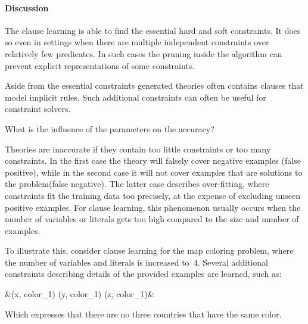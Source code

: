 \paragraph{Discussion}
The clause learning is able to find the essential hard and soft constraints.
It does so even in settings when there are multiple independent constraints over relatively few predicates.
In such cases the pruning inside the algorithm can prevent explicit representations of some constraints.

Aside from the essential constraints generated theories often contains clauses that model implicit rules.
Such additional constraints can often be useful for constraint solvers.

\begin{question}
	What is the influence of the parameters on the accuracy?
	\label{q:cd_acc_influence}
\end{question}

\begin{observation}
	Theories are inaccurate if they contain too little constraints or too many constraints.
	In the first case the theory will falsely cover negative examples (false positive), while in the second case it will not cover examples that are solutions to the problem(false negative).
	The latter case describes over-fitting, where constraints fit the training data too precisely, at the expense of excluding unseen positive examples.
	For clause learning, this phenomenon usually occurs when the number of variables or literals gets too high compared to the size and number of examples.

	To illustrate this, consider clause learning for the map coloring problem, where the number of variables and literals is increased to~$4$.
	Several additional constraints describing details of the provided examples are learned, such as: 
	\begin{shiftedflalign*}
		 &\leftarrow {}(x, color_1) \land {}(y, color_1)  \land {}(z, color_1)&
	\end{shiftedflalign*}
 	Which expresses that there are no three countries that have the same color.
\end{observation}


